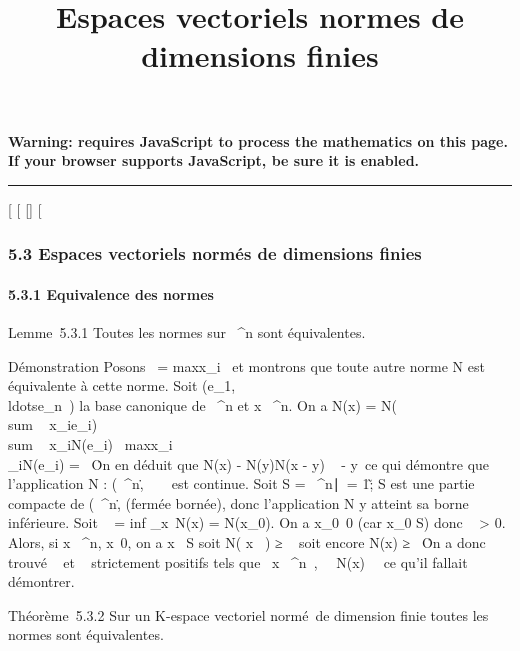 \documentclass[]{article}
\title{Espaces vectoriels normes de dimensions finies}
\author{}
\date{}
\begin{document}
\maketitle

\textbf{Warning: 
requires JavaScript to process the mathematics on this page.\\ If your
browser supports JavaScript, be sure it is enabled.}

\begin{center}\rule{3in}{0.4pt}\end{center}

{[}
{[}
{[}{]}
{[}

\subsubsection{5.3 Espaces vectoriels normés de dimensions finies}

\paragraph{5.3.1 Equivalence des normes}

Lemme~5.3.1 Toutes les normes sur ~^n sont équivalentes.

Démonstration Posons
\x\
= maxx_i~ et
montrons que toute autre norme N est équivalente à cette norme. Soit
(e_1,\\ldotse_n~)
la base canonique de ~^n et x \in {}~^n. On a N(x) =
N(\\sum ~
x_ie_i)
\leq\\sum ~
x_iN(e_i)
\leq\
maxx_i\\\sum
 _iN(e_i) =
\beta~\x\. On en déduit que
N(x) - N(y)\leq N(x - y) \leq \beta~\x
- y\ ce qui démontre que l'application N :
(~^n,\.\) \rightarrow~
~ est continue. Soit S = \x \in
\mathbb{R}~^n∣\x\
= 1\~; S est une partie compacte de
(\mathbb{R}~^n,\.\)
(fermée bornée), donc l'application N y atteint sa borne inférieure.
Soit \alpha~ = inf _x\inS~N(x) =
N(x_0). On a x_0\neq~0 (car
x_0 \in S) donc \alpha~ \textgreater{} 0. Alors, si x \in \mathbb{R}~^n,
x\neq~0, on a  x \over
\x\ \in S soit N( x
\over
\x\ ) ≥ \alpha~ soit
encore N(x) ≥ \alpha~\x\. On
a donc trouvé \alpha~ et \beta~ strictement positifs tels que
\forall~x \in {}~^n~,
\alpha~\x\ \leq N(x) \leq
\beta~\x\, ce qu'il fallait
démontrer.

Théorème~5.3.2 Sur un K-espace vectoriel normé~de dimension finie toutes
les normes sont équivalentes.
\end{document}
